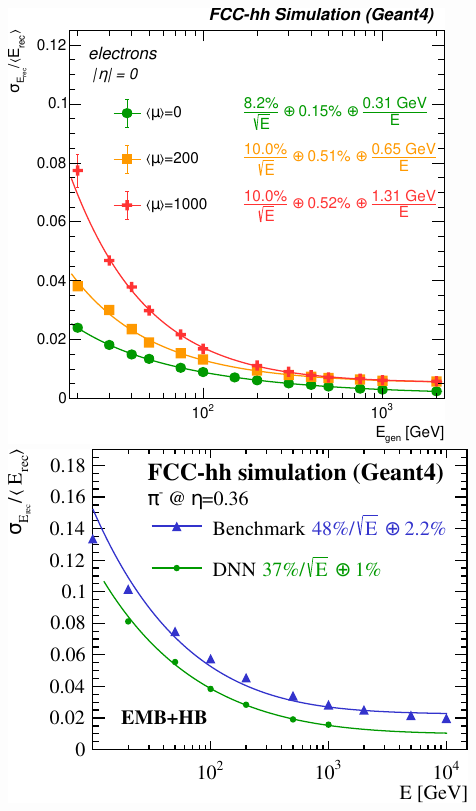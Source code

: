 \documentclass{beamer}
\begin{document}
\begin{frame}
\begin{columns}[c]
    \includegraphics[width=.8\linewidth]{figures/FCC_hh_LAr_electron_performance_mu.pdf}
    \includegraphics[width=.8\linewidth]{figures/FCC_hh_LAr_pion_performance.pdf}
  \end{columns}
\end{frame}
\end{document}
